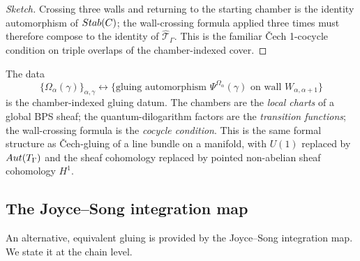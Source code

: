 \begin{proof}[Sketch]
  Crossing three walls and returning to the starting chamber is the identity
  automorphism of $Stab(C)$; the wall-crossing formula applied three
  times must therefore compose to the identity of $\hat{\mathcal{T}}_\Gamma$. This is the
  familiar \v{C}ech 1-cocycle condition on triple overlaps of the
  chamber-indexed cover.
\end{proof}

\begin{remark}
  The data
  \[
    \{\Omega_\alpha(\gamma)\}_{\alpha, \gamma} \longleftrightarrow \{\text{gluing automorphism } \Psi^{\Omega_\alpha}(\gamma) \text{ on wall } W_{\alpha, \alpha+1}\}
  \]
  is the chamber-indexed gluing datum. The chambers are the \emph{local
  charts} of a global BPS sheaf; the quantum-dilogarithm factors are the
  \emph{transition functions}; the wall-crossing formula is the
  \emph{cocycle condition}. This is the same formal structure as
  \v{C}ech-gluing of a line bundle on a manifold, with $U(1)$ replaced by
  $Aut(T_\Gamma)$ and the sheaf cohomology replaced by pointed
  non-abelian sheaf cohomology $H^1$.
\end{remark}

\subsection{The Joyce--Song integration map}

An alternative, equivalent gluing is provided by the Joyce--Song integration
map. We state it at the chain level.

